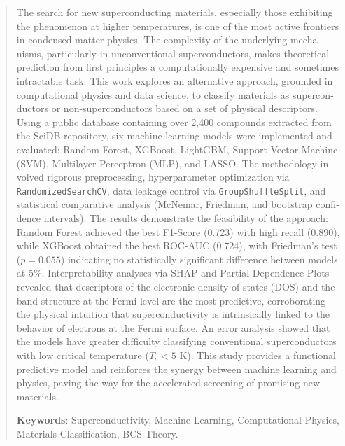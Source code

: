 \documentclass[12pt, a4paper, oneside]{report}
\begin{document}
\newpage
\renewcommand{\abstractname}{Abstract}
\begin{otherlanguage}{english}
\begin{abstract}
\noindent
The search for new superconducting materials, especially those exhibiting the phenomenon at higher temperatures, is one of the most active frontiers in condensed matter physics. The complexity of the underlying mechanisms, particularly in unconventional superconductors, makes theoretical prediction from first principles a computationally expensive and sometimes intractable task. This work explores an alternative approach, grounded in computational physics and data science, to classify materials as superconductors or non-superconductors based on a set of physical descriptors. Using a public database containing over 2,400 compounds extracted from the SciDB repository, six machine learning models were implemented and evaluated: Random Forest, XGBoost, LightGBM, Support Vector Machine (SVM), Multilayer Perceptron (MLP), and LASSO. The methodology involved rigorous preprocessing, hyperparameter optimization via \texttt{RandomizedSearchCV}, data leakage control via \texttt{GroupShuffleSplit}, and statistical comparative analysis (McNemar, Friedman, and bootstrap confidence intervals). The results demonstrate the feasibility of the approach: Random Forest achieved the best F1-Score (0.723) with high recall (0.890), while XGBoost obtained the best ROC-AUC (0.724), with Friedman's test ($p = 0.055$) indicating no statistically significant difference between models at 5\%. Interpretability analyses via SHAP and Partial Dependence Plots revealed that descriptors of the electronic density of states (DOS) and the band structure at the Fermi level are the most predictive, corroborating the physical intuition that superconductivity is intrinsically linked to the behavior of electrons at the Fermi surface. An error analysis showed that the models have greater difficulty classifying conventional superconductors with low critical temperature ($T_c < 5$ K). This study provides a functional predictive model and reinforces the synergy between machine learning and physics, paving the way for the accelerated screening of promising new materials.
\vspace{\baselineskip}

\noindent\textbf{Keywords}: Superconductivity, Machine Learning, Computational Physics, Materials Classification, BCS Theory.
\end{abstract}
\end{otherlanguage}
\end{document}
